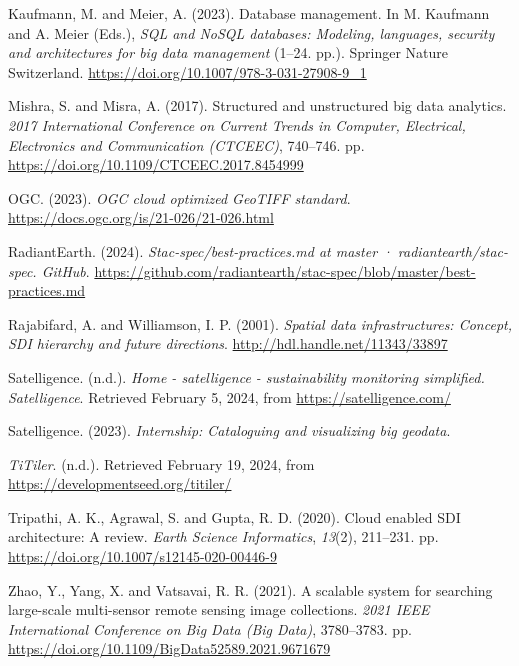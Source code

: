 \documentclass[
  oneside,
  open=any]{scrbook}
\newlength{\cslhangindent}
\newenvironment{CSLReferences}[2] %
 {\begin{list}{}{%
  \setlength{\itemindent}{0pt}
  \setlength{\leftmargin}{0pt}
  \setlength{\parsep}{0pt}
  \ifodd #1
   \setlength{\leftmargin}{\cslhangindent}
   \setlength{\itemindent}{-1\cslhangindent}
  \fi
  \setlength{\itemsep}{#2\baselineskip}}}
 {\end{list}}
\begin{document}
\begin{CSLReferences}{1}{0}
Kaufmann, M. and Meier, A. (2023). Database management. In M. Kaufmann
and A. Meier (Eds.), \emph{{SQL} and {NoSQL} databases: Modeling,
languages, security and architectures for big data management} (1--24.
pp.). Springer Nature Switzerland.
\url{https://doi.org/10.1007/978-3-031-27908-9_1}

Mishra, S. and Misra, A. (2017). Structured and unstructured big data
analytics. \emph{2017 International Conference on Current Trends in
Computer, Electrical, Electronics and Communication ({CTCEEC})},
740--746. pp. \url{https://doi.org/10.1109/CTCEEC.2017.8454999}

OGC. (2023). \emph{{OGC} cloud optimized {GeoTIFF} standard}.
\url{https://docs.ogc.org/is/21-026/21-026.html}

RadiantEarth. (2024). \emph{Stac-spec/best-practices.md at master ·
radiantearth/stac-spec. {GitHub}}.
\url{https://github.com/radiantearth/stac-spec/blob/master/best-practices.md}

Rajabifard, A. and Williamson, I. P. (2001). \emph{Spatial data
infrastructures: Concept, {SDI} hierarchy and future directions}.
\url{http://hdl.handle.net/11343/33897}

Satelligence. (n.d.). \emph{Home - satelligence - sustainability
monitoring simplified. Satelligence}. Retrieved February 5, 2024, from
\url{https://satelligence.com/}

Satelligence. (2023). \emph{Internship: Cataloguing and visualizing big
geodata}.

\emph{{TiTiler}}. (n.d.). Retrieved February 19, 2024, from
\url{https://developmentseed.org/titiler/}

Tripathi, A. K., Agrawal, S. and Gupta, R. D. (2020). Cloud enabled
{SDI} architecture: A review. \emph{Earth Science Informatics},
\emph{13}(2), 211--231. pp.
\url{https://doi.org/10.1007/s12145-020-00446-9}

Zhao, Y., Yang, X. and Vatsavai, R. R. (2021). A scalable system for
searching large-scale multi-sensor remote sensing image collections.
\emph{2021 {IEEE} International Conference on Big Data (Big Data)},
3780--3783. pp. \url{https://doi.org/10.1109/BigData52589.2021.9671679}

\end{CSLReferences}
\end{document}
